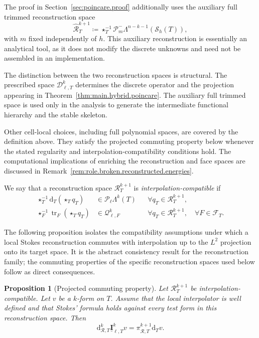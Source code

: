 \documentclass[a4paper,11pt]{article}
\newtheorem{proposition}[theorem]{Proposition}
\theoremstyle{definition}
\newcommand{\DIFF}{\mathrm{d}}
\newcommand{\Sh}{\mathcal{S}_h}
\newcommand{\PL}[2]{\mathcal{P}_{#1}\Lambda^{#2}}
\newcommand{\PLtrim}[2]{\mathcal{P}_{#1}^{-}\Lambda^{#2}}
\newcommand{\uI}[2]{\underline{\boldsymbol{I}}_{\ell,#2}^{#1}}
\newcommand{\Qtrace}[2]{\mathcal Q_{\ell,#1}^{#2}}
\newcommand{\Dpoly}[2]{\mathcal D_{\ell,#1}^{#2}}
\newcommand{\trc}{\operatorname{tr}}
\begin{document}
The proof in Section~\ref{sec:poincare.proof} additionally uses the auxiliary full trimmed reconstruction space
\begin{equation}\label{eq:def.auxiliary.trimmed.derivative.space}
  \widehat{\mathcal R}_T^{k+1}
  \coloneqq
  \star_T^{-1}
  \PLtrim{m}{n-k-1}(\Sh(T)),
\end{equation}
with $m$ fixed independently of $h$.
This auxiliary reconstruction is essentially an analytical tool, as it does not modify the discrete unknowns and need not be assembled in an implementation.

The distinction between the two reconstruction spaces is structural.
The prescribed space $\Dpoly{T}{k}$ determines the discrete operator and the projection appearing in Theorem~\ref{thm:main.hybrid.poincare}.
The auxiliary full trimmed space is used only in the analysis to generate the intermediate functional hierarchy and the stable skeleton.

Other cell-local choices, including full polynomial spaces, are covered by the definition above.
They satisfy the projected commuting property below whenever the stated regularity and interpolation-compatibility conditions hold.
The computational implications of enriching the reconstruction and face spaces are discussed in Remark~\ref{rem:role.broken.reconstructed.energies}.

We say that a reconstruction space $\mathcal R_T^{k+1}$ is \emph{interpolation-compatible} if
\begin{align}
  \star_T^{-1}
  \DIFF_T(\star_Tq_T)
  &\in
  \PL{\ell}{k}(T)
  &&\forall q_T\in\mathcal R_T^{k+1},
  \label{eq:reconstruction.cell.compatibility}
  \\
  \star_F^{-1}
  \trc_F(\star_Tq_T)
  &\in
  \Qtrace{F}{k}
  &&\forall q_T\in\mathcal R_T^{k+1},
  \quad\forall F\in\mathcal F_T.
  \label{eq:reconstruction.face.compatibility}
\end{align}

The following proposition isolates the compatibility assumptions under which a local Stokes reconstruction commutes with interpolation up to the $L^2$ projection onto its target space.
It is the abstract consistency result for the reconstruction family; the commuting properties of the specific reconstruction spaces used below follow as direct consequences.

\begin{proposition}[Projected commuting property]
\label{prop:projected.commuting.forms}
Let $\mathcal R_T^{k+1}$ be interpolation-compatible.
Let $v$ be a $k$-form on $T$.
Assume that the local interpolator is well defined and that Stokes' formula holds against every test form in this reconstruction space.
Then
\[
  \DIFF_{\mathcal R,T}^{k}\uI{k}{T}v
  =
  \pi_{\mathcal R,T}^{k+1}\DIFF_Tv.
\]
\end{proposition}
\end{document}

